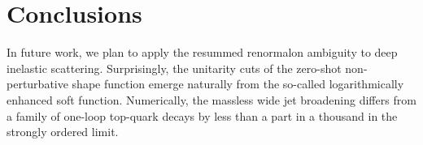 \section{Conclusions}\label{sec:conclusions}

In future work, we plan to apply the resummed renormalon ambiguity to
deep inelastic scattering. Surprisingly, the unitarity cuts of the
zero-shot non-perturbative shape function emerge naturally from the
so-called logarithmically enhanced soft function. Numerically, the
massless wide jet broadening differs from a family of one-loop top-quark
decays by less than a part in a thousand in the strongly ordered limit.

